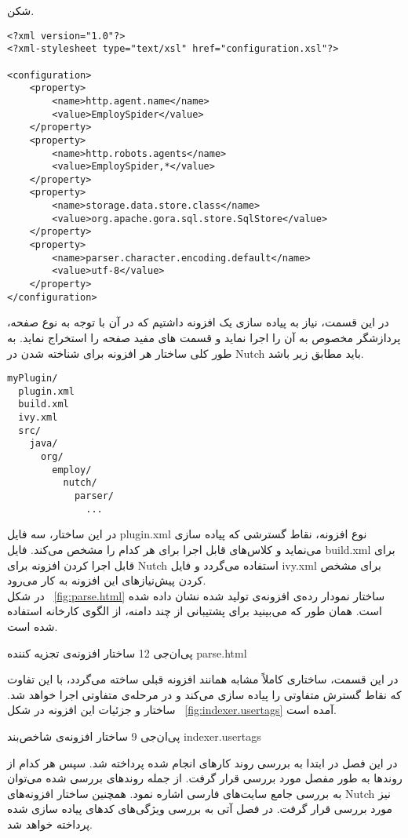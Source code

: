 ‌شکن.

\begin{latin} 
\begin{lstlisting}[style=listXML]
<?xml version="1.0"?>
<?xml-stylesheet type="text/xsl" href="configuration.xsl"?>

<configuration>
	<property>
		<name>http.agent.name</name>
		<value>EmploySpider</value>
	</property>
	<property>
		<name>http.robots.agents</name>
		<value>EmploySpider,*</value>
	</property>
	<property>
		<name>storage.data.store.class</name>
		<value>org.apache.gora.sql.store.SqlStore</value>
	</property>
	<property>
		<name>parser.character.encoding.default</name>
		<value>utf-8</value>
	</property>
</configuration>
\end{lstlisting}
\end{latin}
در این قسمت، نیاز به پیاده سازی یک افزونه داشتیم که در آن با توجه به نوع صفحه، پردازشگر مخصوص به آن را اجرا نماید و قسمت های مفید صفحه را استخراج نماید. به طور کلی ساختار هر افزونه برای شناخته شدن در Nutch باید مطابق زیر باشد.
\begin{latin}
\begin{verbatim}
myPlugin/
  plugin.xml
  build.xml
  ivy.xml
  src/
    java/
      org/
        employ/
          nutch/
            parser/
              ...
\end{verbatim}
\end{latin}
در این ساختار، سه فایل plugin.xml نوع افزونه، نقاط گسترشی که پیاده سازی می‌نماید و کلاس‌های قابل اجرا برای هر کدام را مشخص می‌کند. فایل build.xml برای قابل اجرا کردن افزونه برای Nutch استفاده می‌گردد و فایل ivy.xml برای مشخص کردن پیش‌نیازهای این افزونه به کار می‌رود. 
\\
در شکل ~\ref {fig:parse.html} ساختار نمودار رده‌ی افزونه‌ی تولید شده نشان داده شده است. همان طور که می‌بینید برای پشتیبانی از چند دامنه، از الگوی کارخانه استفاده شده است.

‌پی‌ان‌جی {12} {ساختار افزونه‌ی تجزیه کننده} {parse.html}

در این قسمت، ساختاری کاملاً مشابه همانند افزونه قبلی ساخته می‌گردد، با این تفاوت که نقاط گسترش متفاوتی را پیاده سازی می‌کند و در مرحله‌ی متفاوتی اجرا خواهد شد. ساختار و جزئیات این افزونه در شکل ~\ref {fig:indexer.usertags} آمده است.

‌پی‌ان‌جی {9} {ساختار افزونه‌ی شاخص‌بند} {indexer.usertags}

در این فصل در ابتدا به بررسی روند کارهای انجام شده پرداخته شد. سپس هر کدام از روند‌ها به طور مفصل مورد بررسی قرار گرفت. از جمله روندهای بررسی شده می‌توان به بررسی جامع سایت‌های فارسی اشاره نمود. همچنین ساختار افزونه‌های Nutch نیز مورد بررسی قرار گرفت. در فصل آتی به بررسی ویژگی‌های کدهای پیاده سازی شده پرداخته خواهد شد.
